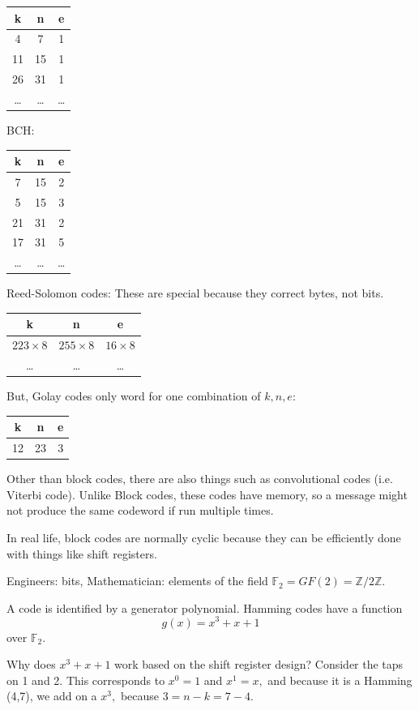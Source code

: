 \documentclass[12pt]{article}
\begin{document}
\begin{tabular}{c|c|c}
k&n&e\\
\hline
4&7&1\\
11&15&1\\
26&31&1\\
\dots&\dots&\dots
\end{tabular}


BCH:

\begin{tabular}{c|c|c}
k&n&e\\
\hline
7&15&2\\
5&15&3\\
21&31&2\\
17&31&5\\
\dots&\dots&\dots
\end{tabular}

Reed-Solomon codes:
These are special because they correct bytes, not bits.

\begin{tabular}{c|c|c}
k&n&e\\
\hline
$223\times 8$&$255\times8$&$16\times8$\\
\dots&\dots&\dots
\end{tabular}

But, Golay codes only word for one combination of $k,n,e$:

\begin{tabular}{c|c|c}
k&n&e\\
\hline
12&23&3\\
\end{tabular}


Other than block codes, there are also things such as convolutional codes (i.e. Viterbi code). Unlike Block codes, these codes have memory, so a message might not produce the same codeword if run multiple times.

In real life, block codes are normally cyclic because they can be efficiently done with things like shift registers.

Engineers: bits, Mathematician: elements of the field $\mathbb{F}_2=GF(2)=\mathbb{Z}/2\mathbb{Z}.$

A code is identified by a generator polynomial. Hamming codes have a function
\[g(x)=x^3+x+1\] over $\mathbb{F}_2.$



Why does $x^3+x+1$ work based on the shift register design? Consider the taps on 1 and 2. This corresponds to $x^0=1$ and $x^1=x,$ and because it is a Hamming (4,7), we add on a $x^3,$ because $3=n-k=7-4.$
\end{document}
